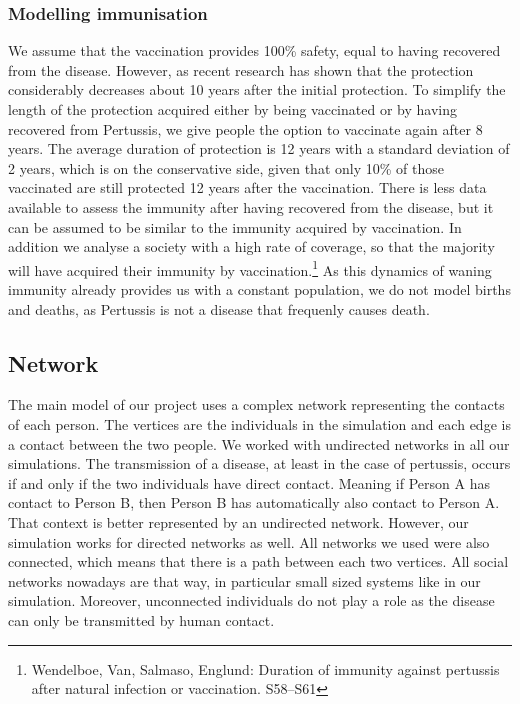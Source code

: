 \documentclass[11pt]{article}
\begin{document}
\subsubsection{Modelling immunisation}
We assume that the vaccination provides 100\% safety, equal to having recovered from the disease. However, as recent research has shown that the protection considerably decreases about 10  years after the initial protection. 
To simplify the length of the protection acquired either by being vaccinated or by having recovered from Pertussis, we give people the option to vaccinate again after 8 years. The average duration of protection is 12 years with a standard deviation of 2 years, which is on the conservative side, given that only 10\% of those vaccinated are still protected 12 years after the vaccination. There is less data available to assess the immunity after having recovered from the disease, but it can be assumed to be similar to the immunity acquired by vaccination. In addition we analyse a society with a high rate of coverage, so that the majority will have acquired their immunity by vaccination.\footnote{Wendelboe, Van, Salmaso, Englund: Duration of immunity against pertussis after natural infection or vaccination. S58–S61} 
As this dynamics of waning immunity already provides us with a constant population, we do not model births and deaths, as Pertussis is not a disease that frequenly causes death. 

\subsection{Network}

The main model of our project uses a complex network representing the contacts of each person. The vertices are the individuals in the simulation and each edge is a contact between the two people. We worked with undirected networks in all our simulations. The transmission of a disease, at least in the case of pertussis, occurs if and only if the two individuals have direct contact. Meaning if Person A has contact to Person B, then Person B has automatically also contact to Person A. That context is better represented by an undirected network. However, our simulation works for directed networks as well.
All networks we used were also connected, which means that there is a path between each two vertices. All social networks nowadays are that way, in particular small sized systems like in our simulation. Moreover, unconnected individuals do not play a role as the disease can only be transmitted by human contact.
\vspace{14px}
\end{document}
